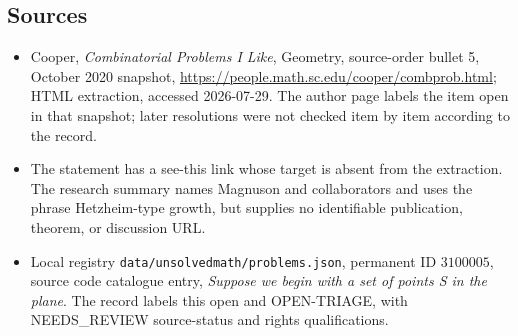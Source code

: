 \documentclass[11pt]{article}
\begin{document}
\subsection{Sources}
\begin{itemize}
\item Cooper, \emph{Combinatorial Problems I Like}, Geometry, source-order bullet 5, October 2020 snapshot, \url{https://people.math.sc.edu/cooper/combprob.html}; HTML extraction, accessed 2026-07-29. The author page labels the item open in that snapshot; later resolutions were not checked item by item according to the record.
\item The statement has a see-this link whose target is absent from the extraction. The research summary names Magnuson and collaborators and uses the phrase Hetzheim-type growth, but supplies no identifiable publication, theorem, or discussion URL.
\item Local registry \texttt{data/unsolvedmath/problems.json}, permanent ID $3100005$, source code catalogue entry, \emph{Suppose we begin with a set of points S in the plane}. The record labels this open and OPEN-TRIAGE, with NEEDS\_REVIEW source-status and rights qualifications.
\end{itemize}
\end{document}
